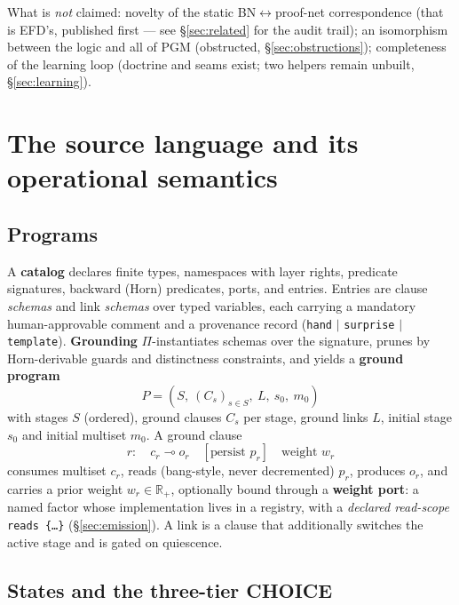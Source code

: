 \documentclass[11pt]{article}
\newcommand{\lolli}{\multimap}
\newcommand{\R}{\mathbb{R}}
\newcommand{\Rpos}{\R_{+}}
\theoremstyle{plain}
\theoremstyle{definition}
\theoremstyle{remark}
\begin{document}
What is \emph{not} claimed: novelty of the static
BN$\leftrightarrow$proof-net correspondence (that is EFD's, published
first --- see \S\ref{sec:related} for the audit trail); an isomorphism
between the logic and all of PGM (obstructed,
\S\ref{sec:obstructions}); completeness of the learning loop (doctrine
and seams exist; two helpers remain unbuilt, \S\ref{sec:learning}).

\section{The source language and its operational semantics}
\label{sec:language}

\subsection{Programs}

A \textbf{catalog} declares finite types, namespaces with layer rights,
predicate signatures, backward (Horn) predicates, ports, and entries.
Entries are clause \emph{schemas} and link \emph{schemas} over typed
variables, each carrying a mandatory human-approvable comment and a
provenance record (\texttt{hand} $\mid$ \texttt{surprise} $\mid$
\texttt{template}). \textbf{Grounding} $\Pi$-instantiates schemas over
the signature, prunes by Horn-derivable guards and distinctness
constraints, and yields a \textbf{ground program}
\[
  P = (S,\ (C_s)_{s\in S},\ L,\ s_0,\ m_0)
\]
with stages $S$ (ordered), ground clauses $C_s$ per stage, ground links
$L$, initial stage $s_0$ and initial multiset $m_0$. A ground clause
\[
  r:\quad c_r \lolli o_r \quad [\text{persist } p_r] \quad
  \text{weight } w_r
\]
consumes multiset $c_r$, reads (bang-style, never decremented) $p_r$,
produces $o_r$, and carries a prior weight $w_r \in \Rpos$, optionally
bound through a \textbf{weight port}: a named factor whose implementation
lives in a registry, with a \emph{declared read-scope}
\texttt{reads \{\dots\}} (\S\ref{sec:emission}). A link is a clause that
additionally switches the active stage and is gated on quiescence.

\subsection{States and the three-tier CHOICE}\label{sec:choice}
\end{document}
